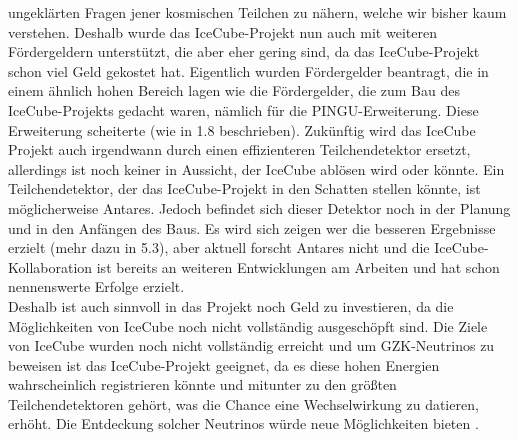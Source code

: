     ungeklärten Fragen jener kosmischen Teilchen zu nähern, welche wir bisher kaum verstehen. Deshalb wurde 
    das IceCube-Projekt nun auch mit weiteren Fördergeldern unterstützt, die aber eher gering sind, da das 
    IceCube-Projekt schon viel Geld gekostet hat. Eigentlich wurden Fördergelder beantragt, die in einem 
    ähnlich hohen Bereich lagen wie die Fördergelder, die zum Bau des IceCube-Projekts gedacht waren, 
    nämlich für die PINGU-Erweiterung. Diese Erweiterung scheiterte (wie in 1.8 beschrieben).
    Zukünftig wird das IceCube Projekt auch irgendwann durch einen effizienteren Teilchendetektor ersetzt, 
    allerdings ist noch keiner in Aussicht, der IceCube ablösen wird oder könnte. Ein Teilchendetektor, 
    der das IceCube-Projekt in den Schatten stellen könnte, ist möglicherweise Antares. Jedoch befindet 
    sich dieser Detektor noch in der Planung und in den Anfängen des Baus. Es wird sich zeigen wer die 
    besseren Ergebnisse erzielt (mehr dazu in 5.3), aber aktuell forscht Antares nicht und die 
    IceCube-Kollaboration ist bereits an weiteren Entwicklungen am Arbeiten und hat schon nennenswerte 
    Erfolge erzielt. \\
    Deshalb ist auch sinnvoll in das Projekt noch Geld zu investieren, da die Möglichkeiten von 
    IceCube noch nicht vollständig ausgeschöpft sind. Die Ziele von IceCube wurden noch nicht 
    vollständig erreicht und um GZK-Neutrinos zu beweisen ist das IceCube-Projekt geeignet, da es diese 
    hohen Energien wahrscheinlich registrieren könnte und mitunter zu den größten Teilchendetektoren gehört, 
    was die Chance eine Wechselwirkung zu datieren, erhöht. Die Entdeckung solcher Neutrinos würde neue 
    Möglichkeiten bieten \cite{DeFuInt18}.


